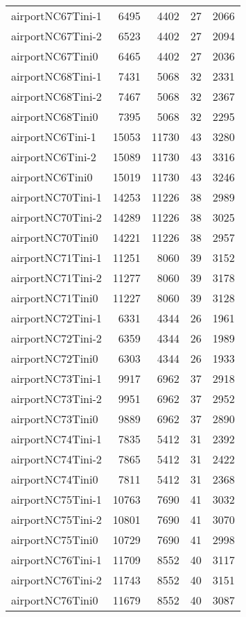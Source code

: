 \begin{longtable}{lrrrr}
airportNC67Tini-1 & 6495 & 4402 & 27 & 2066 \\
airportNC67Tini-2 & 6523 & 4402 & 27 & 2094 \\
airportNC67Tini0 & 6465 & 4402 & 27 & 2036 \\
airportNC68Tini-1 & 7431 & 5068 & 32 & 2331 \\
airportNC68Tini-2 & 7467 & 5068 & 32 & 2367 \\
airportNC68Tini0 & 7395 & 5068 & 32 & 2295 \\
airportNC6Tini-1 & 15053 & 11730 & 43 & 3280 \\
airportNC6Tini-2 & 15089 & 11730 & 43 & 3316 \\
airportNC6Tini0 & 15019 & 11730 & 43 & 3246 \\
airportNC70Tini-1 & 14253 & 11226 & 38 & 2989 \\
airportNC70Tini-2 & 14289 & 11226 & 38 & 3025 \\
airportNC70Tini0 & 14221 & 11226 & 38 & 2957 \\
airportNC71Tini-1 & 11251 & 8060 & 39 & 3152 \\
airportNC71Tini-2 & 11277 & 8060 & 39 & 3178 \\
airportNC71Tini0 & 11227 & 8060 & 39 & 3128 \\
airportNC72Tini-1 & 6331 & 4344 & 26 & 1961 \\
airportNC72Tini-2 & 6359 & 4344 & 26 & 1989 \\
airportNC72Tini0 & 6303 & 4344 & 26 & 1933 \\
airportNC73Tini-1 & 9917 & 6962 & 37 & 2918 \\
airportNC73Tini-2 & 9951 & 6962 & 37 & 2952 \\
airportNC73Tini0 & 9889 & 6962 & 37 & 2890 \\
airportNC74Tini-1 & 7835 & 5412 & 31 & 2392 \\
airportNC74Tini-2 & 7865 & 5412 & 31 & 2422 \\
airportNC74Tini0 & 7811 & 5412 & 31 & 2368 \\
airportNC75Tini-1 & 10763 & 7690 & 41 & 3032 \\
airportNC75Tini-2 & 10801 & 7690 & 41 & 3070 \\
airportNC75Tini0 & 10729 & 7690 & 41 & 2998 \\
airportNC76Tini-1 & 11709 & 8552 & 40 & 3117 \\
airportNC76Tini-2 & 11743 & 8552 & 40 & 3151 \\
airportNC76Tini0 & 11679 & 8552 & 40 & 3087 \\

\end{longtable}

